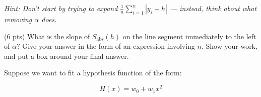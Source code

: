 \documentclass[twoside,12pt]{article}
\begin{document}
\begin{probset}
\begin{prob}[(12 pts)]
\begin{subprobset}
\begin{subprob}
\textit{Hint: Don't start by trying to expand $\frac{1}{n} \sum_{i = 1}^n |y_i - h|$ --- instead, think about what removing $\alpha$ does.}

\begin{responsebox}{2.5in}
    
\end{responsebox}
    
\end{subprob}

\newpage

\begin{subprob}(6 pts) What is the slope of $S_\text{abs}(h)$ on the line segment immediately to the left of $\alpha$? Give your answer in the form of an expression involving $n$. Show your work, and put a $\boxed{\text{box}}$ around your final answer.

\begin{responsebox}{5in}
    
\end{responsebox}
    
\end{subprob}





    
    
    
\end{subprobset}
    
\end{prob}

\newpage

\begin{prob}[(19 pts)]

Suppose we want to fit a hypothesis function of the form:

$$H(x) = w_0 + w_1 x^2$$


\end{prob}
\end{probset}
\end{document}
